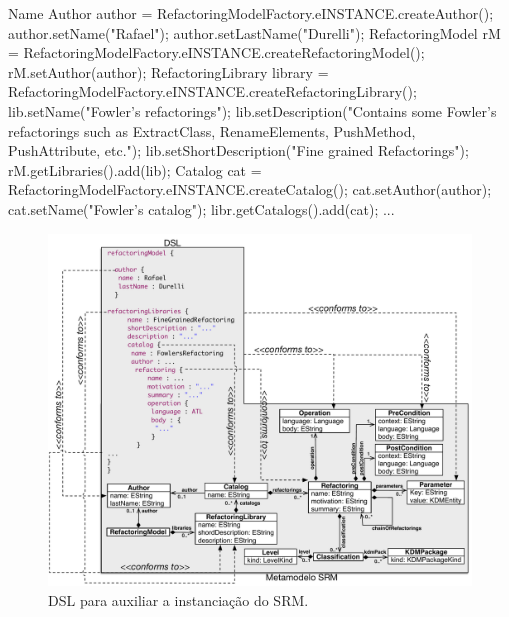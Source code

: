 \begin{codigo}[caption={[Instanciação do metamodelo SRM programaticamente.] Instanciação do metamodelo SRM.},escapeinside={(*@}{@*)}, basicstyle=\footnotesize, label={cod:instancia_do_SRM}, language=Java]{Name}
Author author = RefactoringModelFactory.eINSTANCE.createAuthor();
author.setName("Rafael");
author.setLastName("Durelli");
RefactoringModel rM = RefactoringModelFactory.eINSTANCE.createRefactoringModel();
rM.setAuthor(author);
RefactoringLibrary library = RefactoringModelFactory.eINSTANCE.createRefactoringLibrary();
lib.setName("Fowler's refactorings");
lib.setDescription("Contains some Fowler's refactorings such as ExtractClass, RenameElements, PushMethod, PushAttribute, etc.");
lib.setShortDescription("Fine grained Refactorings");
rM.getLibraries().add(lib);
Catalog cat = RefactoringModelFactory.eINSTANCE.createCatalog();
cat.setAuthor(author);
cat.setName("Fowler's catalog");
libr.getCatalogs().add(cat);
...
\end{codigo}

\begin{figure}[!h]
	\centering
	\caption{DSL para auxiliar a instanciação do SRM.}
	\label{fig:DSL_SRM}
	\includegraphics[scale=0.6]{images/MetaModelEDSL}
	\fautor
\end{figure}

